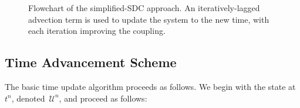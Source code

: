 \documentclass[linenumbers]{aastex631}
\newcommand{\castro}{{\sf Castro}}
\newcommand{\Uc}{{\,\bm{\mathcal{U}}}}
\newcommand{\Rb}{{\bf R}}
\newcommand{\Adv}[1]{{\left [\boldsymbol{\mathcal{A}} \left(#1\right)\right]}}
\newcommand{\Advs}[1]{\boldsymbol{\mathcal{A}} \left(#1\right)}
\begin{document}
\begin{figure}[t]
\caption{\label{fig:sdc_flowchart} Flowchart of the simplified-SDC
  approach.  An iteratively-lagged advection term is used to update
  the system to the new time, with each iteration improving the
  coupling.}
\end{figure}

\subsection{Time Advancement Scheme}
The basic time update algorithm proceeds as follows.
We begin with the state at $t^n$, denoted $\Uc^n$, and proceed as follows:
\end{document}
